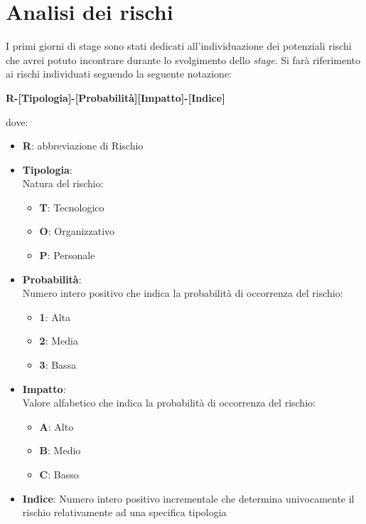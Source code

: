 \section{Analisi dei rischi}
I primi giorni di stage sono stati dedicati all'individuazione dei potenziali rischi che avrei potuto incontrare durante lo svolgimento dello \textit{stage}.
Si farà riferimento ai rischi individuati seguendo la seguente notazione: 
\begin{center}
    \textbf{R-[Tipologia]-[Probabilità][Impatto]-[Indice]}
\end{center}
dove:
\begin{itemize}
    \item \textbf{R}: abbreviazione di Rischio
    \item \textbf{Tipologia}: \\ Natura del rischio: \begin{itemize}
        \item \textbf{T}: Tecnologico
        \item \textbf{O}: Organizzativo
        \item \textbf{P}: Personale
    \end{itemize}
    \item \textbf{Probabilità}: \\ Numero intero positivo che indica la probabilità di occorrenza del rischio: \begin{itemize}
        \item \textbf{1}: Alta
        \item \textbf{2}: Media
        \item \textbf{3}: Bassa
    \end{itemize}
    \item \textbf{Impatto}: \\ Valore alfabetico che indica la probabilità di occorrenza del rischio: \begin{itemize}
        \item \textbf{A}: Alto
        \item \textbf{B}: Medio
        \item \textbf{C}: Basso
    \end{itemize}
    \item \textbf{Indice}: Numero intero positivo incrementale che determina univocamente il rischio relativamente ad una specifica tipologia
\end{itemize}

